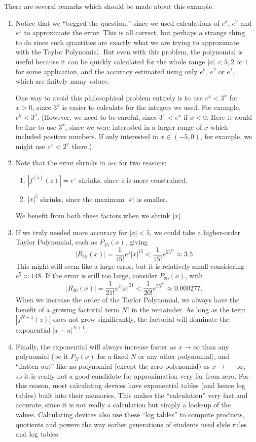 There are several remarks which should be made about this example.
\begin{enumerate}
\item Notice that we ``begged the question,'' since we used
calculations of $e^5$, $e^2$ and $e^1$ to approximate the error.
This is all correct, but perhaps a strange thing to do since
such quantities are exactly what we are trying to approximate
with the Taylor Polynomial.  But even with this problem,
the polynomial is useful because it can be quickly calculated
for the whole range $|x|<5,2$ or $1$ for some
application,  and the accuracy estimated
using only $e^5$, $e^2$ or $e^1$, which are finitely many
values.
 
One way to avoid this philosophical problem entirely is to use
$e^x<3^x$ for $x>0$, since $3^x$ is easier to calculate
for the integers we used.  For example, $e^5<3^5$.
  (However, we need to be careful,
since $3^x<e^x$ if $x<0$.  Here it would be fine to use $3^x$,
since we were interested in a larger range of $x$ which included
positive numbers.  If only interested in $x\in(-5,0)$, for 
example, we might use $e^x<2^x$ there.)
\item Note that the error shrinks in a-c 
for two reasons:
\begin{enumerate}
\item $\left|f^{(5)}(z)\right|=e^z$ shrinks, since $z$ is more constrained.
\item $|x|^5$ shrinks, since the maximum $|x|$ is smaller.
\end{enumerate}
We benefit from both these factors when we shrink $|x|$.
\item If we truly needed more accuracy for $|x|<5$, we could
take a higher-order Taylor Polynomial, such as $P_{15}(x)$, 
giving
$$|R_{15}(x)|=\frac1{15!}e^z|x|^{15}
<\frac1{15!}e^55^{15}\approx 3.5$$
This might still seem like a large error, but it is relatively small
considering $e^5\approx148$.  If the error is still too large, 
consider $P_{20}(x)$, with
$$|R_{20}(x)|=\frac1{21!}e^z|x|^{21}<\frac1{20!}e^55^{20}
\approx0.000277. 
$$ 
When we increase the order of the Taylor Polynomial, we always
have the benefit of a growing factorial term $N!$ in the 
remainder.  As long as the term $\left|f^{N+1}(z)\right|$
does not grow significantly, the factorial will dominate 
the exponential $|x-a|^{N+1}$.
\item Finally, the exponential will always increase faster 
as $x\to\infty$ than
any polynomial (be it $P_N(x)$ for a fixed $N$ or any other
polynomial), and ``flatten out'' like no polynomial
(except the zero polynomial) as $x\to\,-\infty$, so
it is really not a good candidate for approximation very
far from zero.  For this reason, most calculating devices have
exponential tables (and hence log tables) built into their
memories.  This makes the ``calculation'' very fast and
accurate, since it is not really a calculation but simply a
look-up of the values.  Calculating devices also use 
these ``log tables'' to compute products, quotients and powers
the way earlier generations of students used slide rules
and log tables. 

\end{enumerate}
